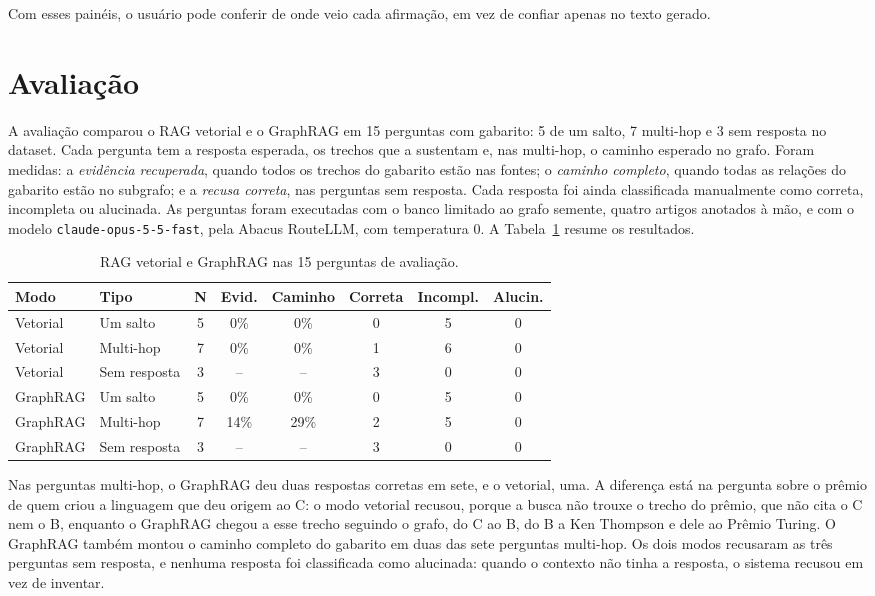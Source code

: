 \documentclass[12pt]{article}
\begin{document}
Com esses painéis, o usuário pode conferir de onde veio cada afirmação, em vez de confiar
apenas no texto gerado.

\section{Avaliação}
\label{sec:avaliacao}

A avaliação comparou o RAG vetorial e o GraphRAG em 15 perguntas com gabarito: 5 de um
salto, 7 multi-hop e 3 sem resposta no dataset. Cada pergunta tem a resposta esperada, os
trechos que a sustentam e, nas multi-hop, o caminho esperado no grafo. Foram medidas: a
\textit{evidência recuperada}, quando todos os trechos do gabarito estão nas fontes; o
\textit{caminho completo}, quando todas as relações do gabarito estão no subgrafo; e a
\textit{recusa correta}, nas perguntas sem resposta. Cada resposta foi ainda classificada
manualmente como correta, incompleta ou alucinada. As perguntas foram executadas com o
banco limitado ao grafo semente, quatro artigos anotados à mão, e com o modelo
\texttt{claude-opus-5-5-fast}, pela Abacus RouteLLM, com temperatura 0. A
Tabela~\ref{tab:avaliacao} resume os resultados.

\begin{table}[ht]
\centering
\caption{RAG vetorial e GraphRAG nas 15 perguntas de avaliação.}
\label{tab:avaliacao}
\small
\begin{tabular}{llcccccc}
\toprule
\textbf{Modo} & \textbf{Tipo} & \textbf{N} & \textbf{Evid.} & \textbf{Caminho} & \textbf{Correta} & \textbf{Incompl.} & \textbf{Alucin.} \\
\midrule
Vetorial & Um salto & 5 & 0\% & 0\% & 0 & 5 & 0 \\
Vetorial & Multi-hop & 7 & 0\% & 0\% & 1 & 6 & 0 \\
Vetorial & Sem resposta & 3 & -- & -- & 3 & 0 & 0 \\
GraphRAG & Um salto & 5 & 0\% & 0\% & 0 & 5 & 0 \\
GraphRAG & Multi-hop & 7 & 14\% & 29\% & 2 & 5 & 0 \\
GraphRAG & Sem resposta & 3 & -- & -- & 3 & 0 & 0 \\
\bottomrule
\end{tabular}
\end{table}

Nas perguntas multi-hop, o GraphRAG deu duas respostas corretas em sete, e o vetorial,
uma. A diferença está na pergunta sobre o prêmio de quem criou a linguagem que deu origem
ao C: o modo vetorial recusou, porque a busca não trouxe o trecho do prêmio, que não cita
o C nem o B, enquanto o GraphRAG chegou a esse trecho seguindo o grafo, do C ao B, do B a
Ken Thompson e dele ao Prêmio Turing. O GraphRAG também montou o caminho completo do
gabarito em duas das sete perguntas multi-hop. Os dois modos recusaram as três perguntas
sem resposta, e nenhuma resposta foi classificada como alucinada: quando o contexto não
tinha a resposta, o sistema recusou em vez de inventar.
\end{document}
